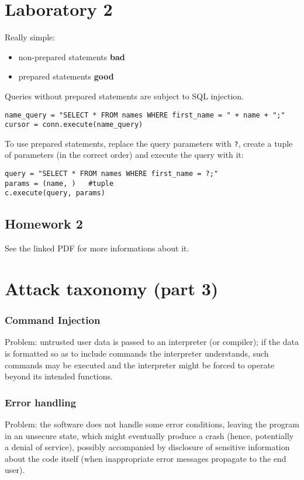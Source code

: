 \documentclass[a4paper, 10pt, titlepage]{article}
\begin{document}
\section{Laboratory 2}
Really simple:
\begin{itemize}
\item non-prepared statements \textbf{bad}
\item prepared statements \textbf{good}
\end{itemize}
Queries without prepared statements are subject to SQL injection.
\begin{lstlisting}
name_query = "SELECT * FROM names WHERE first_name = " + name + ";"
cursor = conn.execute(name_query)
\end{lstlisting}
To use prepared statements, replace the query parameters with \lstinline|?|, create a tuple of parameters (in the correct order) and execute the query with it:
\begin{lstlisting}
query = "SELECT * FROM names WHERE first_name = ?;"
params = (name, )	#tuple
c.execute(query, params)
\end{lstlisting}
\subsection{Homework 2}
	See the linked PDF for more informations about it. 
	
\newpage
\section{Attack taxonomy (part 3)}
\subsubsection*{Command Injection}
Problem: untrusted user data is passed to an interpreter (or compiler); if the data is formatted so as to include commands the interpreter understands, such commands may be executed and the interpreter might be forced to operate beyond its intended functions.

\subsubsection*{Error handling}
Problem: the software does not handle some error conditions, leaving the program in an unsecure state, which might eventually produce a crash (hence, potentially a denial of service), possibly accompanied by disclosure of sensitive information about the code itself (when inappropriate error messages propagate to the end user).
\end{document}
